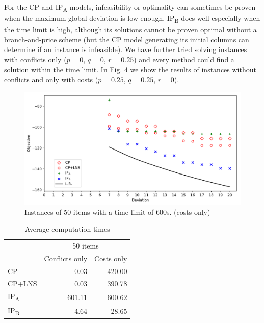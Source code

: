 \documentclass{llncs}
\begin{document}
For the CP and IP\textsubscript{A} models, infeasibility or optimality can sometimes be proven when the maximum global deviation is low enough. IP\textsubscript{B} does well especially when the time limit is high, although its solutions cannot be proven optimal without a branch-and-price scheme (but the CP model generating its initial columns can determine if an instance is infeasible). We have further tried solving instances with conflicts only ($p=0$, $q=0$, $r=0.25$) and every method could find a solution within the time limit. In Fig. 4 we show the results of instances without conflicts and only with costs ($p=0.25$, $q=0.25$, $r=0$).

\begin{figure}[H]
  \begin{center}
    \caption[]{Instances of 50 items with a time limit of 600s. (costs only)}
    \includegraphics[scale=0.52]{cost50d-norm1-tl600.pdf}
  \end{center}
\end{figure}

\begin{table}[H]
  \centering
  \setlength{\tabcolsep}{8pt}
\caption{Average computation times}
\begin{tabular}{lrr}
  \cline{2-3}\noalign{\smallskip}
  & \multicolumn{2}{c}{50 items} \\
  \cline{2-3}\noalign{\smallskip}
& Conflicts only & Costs only \\
\noalign{\smallskip}
\hline
\noalign{\smallskip}
CP    & 0.03 & 420.00 \\
CP+LNS & 0.03 & 390.78 \\
IP\textsubscript{A} & 601.11 & 600.62 \\
IP\textsubscript{B} & 4.64 & 28.65 \\
\hline
\end{tabular}
\end{table}
\end{document}
